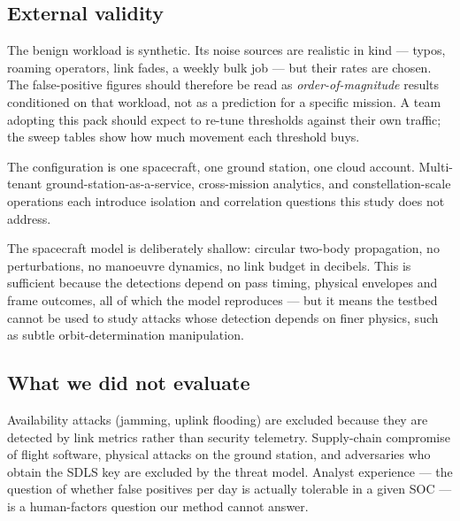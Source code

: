 \subsection{External validity}

The benign workload is synthetic. Its noise sources are realistic in kind ---
typos, roaming operators, link fades, a weekly bulk job --- but their rates are
chosen. The false-positive figures should therefore be read as
\emph{order-of-magnitude} results conditioned on that workload, not as a
prediction for a specific mission. A team adopting this pack should expect to
re-tune thresholds against their own traffic; the sweep tables show how much
movement each threshold buys.

The configuration is one spacecraft, one ground station, one cloud account.
Multi-tenant ground-station-as-a-service, cross-mission analytics, and
constellation-scale operations each introduce isolation and correlation questions
this study does not address.

The spacecraft model is deliberately shallow: circular two-body propagation, no
perturbations, no manoeuvre dynamics, no link budget in decibels. This is
sufficient because the detections depend on pass timing, physical envelopes and
frame outcomes, all of which the model reproduces --- but it means the testbed
cannot be used to study attacks whose detection depends on finer physics, such as
subtle orbit-determination manipulation.

\subsection{What we did not evaluate}

Availability attacks (jamming, uplink flooding) are excluded because they are
detected by link metrics rather than security telemetry. Supply-chain compromise
of flight software, physical attacks on the ground station, and adversaries who
obtain the SDLS key are excluded by the threat model. Analyst experience --- the
question of whether \ResFPDay{} false positives per day is actually tolerable in
a given SOC --- is a human-factors question our method cannot answer.
